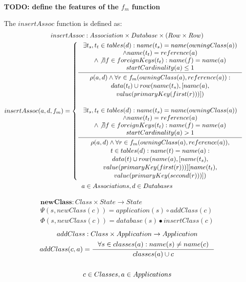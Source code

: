 \documentclass[11pt]{article}
\begin{document}
\textbf{TODO: define the features of the $f_m$ function}

The $insertAssoc$ function is defined as:
\begin{gather*}
insertAssoc : Association \times Database \times (Row \times Row) \\
insertAssoc(a, d, f_m) = \begin{cases}
\inference{ \exists t_s, t_t \in tables(d) : name(t_s) = name(owningClass(a)) \\ \wedge name(t_t) = reference(a) \\ \wedge \not \exists f \in foreignKeys(t_t) : name(f) = name(a) \\ startCardinality(a) \leq 1}{\begin{gathered}
\rho(a,d) \wedge \forall r \in f_m(owningClass(a), reference(a)) : \\ data(t_t) \cup row(name(t_s), [name(a), \\ value(primaryKey(first(r)))]) 
\end{gathered}
 }
 \\ \\
\inference{ \exists t_s, t_t \in tables(d) : name(t_s) = name(owningClass(a)) \\ \wedge name(t_t) = reference(a) \\ \wedge \not \exists f \in foreignKeys(t_t) : name(f) = name(a) \\ startCardinality(a) > 1}{\begin{gathered}
\rho(a,d) \wedge \forall r \in f_m(owningClass(a), reference(a)),\\ t \in tables(d) : name(t) = name(a) : \\ data(t) \cup row(name(a), [name(t_s), \\ value(primaryKey(first(r)))] [name(t_t), \\ value(primaryKey(second(r)))])
\end{gathered}
 } 
 \end{cases}\\
 a \in Associations, d \in Databases
\end{gather*}

\begin{gather*}
\mathbf{newClass} : Class \times State \rightarrow State \\
\Psi(s, newClass(c)) = application(s) \circ addClass(c) \\
\Phi(s, newClass(c)) = database(s) \bullet insertClass(c) 
\end{gather*}
\begin{gather*}
addClass: Class \times Application \rightarrow Application \\ 
addClass(c, a) = \inference{\forall s \in classes(a) : name(s) \neq name(c)}{classes(a) \cup c} \\ \\
c \in Classes, a \in Applications
\end{gather*}
\end{document}
